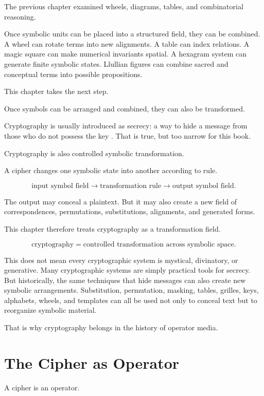 \documentclass[11pt]{book}
\begin{document}
The previous chapter examined wheels, diagrams, tables, and combinatorial reasoning.

Once symbolic units can be placed into a structured field, they can be combined. A wheel can rotate terms into new alignments. A table can index relations. A magic square can make numerical invariants spatial. A hexagram system can generate finite symbolic states. Llullian figures can combine sacred and conceptual terms into possible propositions.

This chapter takes the next step.

Once symbols can be arranged and combined, they can also be transformed.

Cryptography is usually introduced as secrecy: a way to hide a message from those who do not possess the key \cite{Kahn1996Codebreakers,Singh1999CodeBook}. That is true, but too narrow for this book.

Cryptography is also controlled symbolic transformation.

A cipher changes one symbolic state into another according to rule.

\[
\text{input symbol field}
\rightarrow
\text{transformation rule}
\rightarrow
\text{output symbol field}.
\]

The output may conceal a plaintext. But it may also create a new field of correspondences, permutations, substitutions, alignments, and generated forms.

This chapter therefore treats cryptography as a transformation field.

\[
\text{cryptography} = \text{controlled transformation across symbolic space}.
\]

This does not mean every cryptographic system is mystical, divinatory, or generative. Many cryptographic systems are simply practical tools for secrecy. But historically, the same techniques that hide messages can also create new symbolic arrangements. Substitution, permutation, masking, tables, grilles, keys, alphabets, wheels, and templates can all be used not only to conceal text but to reorganize symbolic material.

That is why cryptography belongs in the history of operator media.

\section{The Cipher as Operator}

A cipher is an operator.
\end{document}
